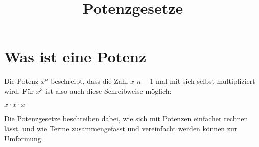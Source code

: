 \documentclass[10pt,a4paper]{article}
\begin{document}
\setlength{\parindent}{0cm}

\title{Potenzgesetze}

\makeatletter
\def\@maketitle{%
  \newpage
  \null
  \vskip 2em%
  \begin{center}%
  \let \footnote \thanks
    {\Huge\bfseries\@title \par}%
    \vskip 1.5em%
    {\large
      \lineskip .5em%
      \begin{tabular}[t]{c}%
        \@author
      \end{tabular}\par}%
    \vskip 1em%
    {\large \@date}%
  \end{center}%
  \par
  \vskip 1.5em}
\makeatother

\author{}
\date{}

\maketitle

\section*{Was ist eine Potenz}
Die Potenz $x^n$ beschreibt, dass die Zahl $x$ $n-1$ mal mit sich 
selbst multipliziert wird. Für $x^3$ ist also auch diese Schreibweise möglich:

$x \cdot x \cdot x$ \newline

Die Potenzgesetze beschreiben dabei, wie sich mit Potenzen einfacher rechnen lässt,
und wie Terme zusammengefasst und vereinfacht werden können zur Umformung.
\end{document}
